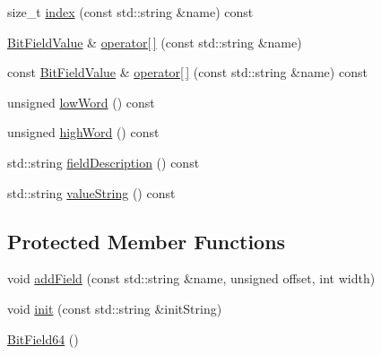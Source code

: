 \begin{DoxyCompactItemize}
\item 
size\_\-t \hyperlink{class_d_d4hep_1_1_d_d_segmentation_1_1_bit_field64_a425e8216ef8608e969bdd6c30fd95588}{index} (const std::string \&name) const 
\item 
\hyperlink{class_d_d4hep_1_1_d_d_segmentation_1_1_bit_field_value}{BitFieldValue} \& \hyperlink{class_d_d4hep_1_1_d_d_segmentation_1_1_bit_field64_a452aca96e8536e9fc262b7d5255f0e02}{operator\mbox{[}$\,$\mbox{]}} (const std::string \&name)
\item 
const \hyperlink{class_d_d4hep_1_1_d_d_segmentation_1_1_bit_field_value}{BitFieldValue} \& \hyperlink{class_d_d4hep_1_1_d_d_segmentation_1_1_bit_field64_a5aadc2c387ee66ad3184dc00f7d5a36c}{operator\mbox{[}$\,$\mbox{]}} (const std::string \&name) const 
\item 
unsigned \hyperlink{class_d_d4hep_1_1_d_d_segmentation_1_1_bit_field64_abb2987e2f7638dc69cb9ae8b2c4b5fa9}{lowWord} () const 
\item 
unsigned \hyperlink{class_d_d4hep_1_1_d_d_segmentation_1_1_bit_field64_a1cfbecb4925f9198b07f64e53911b3ae}{highWord} () const 
\item 
std::string \hyperlink{class_d_d4hep_1_1_d_d_segmentation_1_1_bit_field64_aa2ca281867e8cfccab7111e0c439a8f8}{fieldDescription} () const 
\item 
std::string \hyperlink{class_d_d4hep_1_1_d_d_segmentation_1_1_bit_field64_a12b1d9c2421cd65cc4d2fc1d390b5b4e}{valueString} () const 
\end{DoxyCompactItemize}
\subsection*{Protected Member Functions}
\begin{DoxyCompactItemize}
\item 
void \hyperlink{class_d_d4hep_1_1_d_d_segmentation_1_1_bit_field64_ae34df46a8957a5a6df76d194889a7d06}{addField} (const std::string \&name, unsigned offset, int width)
\item 
void \hyperlink{class_d_d4hep_1_1_d_d_segmentation_1_1_bit_field64_a05fc3d97d522cd5e1d7cf94483c89bc4}{init} (const std::string \&initString)
\item 
\hyperlink{class_d_d4hep_1_1_d_d_segmentation_1_1_bit_field64_a16079b52f710e962e5f3630f236383d6}{BitField64} ()
\end{DoxyCompactItemize}
